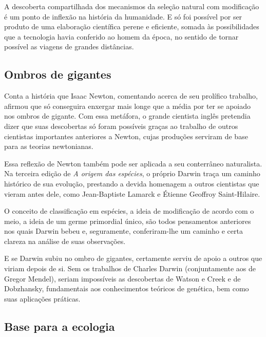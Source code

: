 \documentclass[11pt]{extarticle}
\begin{document}


A descoberta compartilhada dos mecanismos da seleção natural com modificação
é um ponto de inflexão na história da humanidade. E só foi possível por ser
produto de uma elaboração científica perene e eficiente, somada às
possibilidades que a tecnologia havia conferido ao homem da época, no sentido
de tornar possível as viagens de grandes distâncias.




\subsection{Ombros de gigantes}

Conta a história que Isaac Newton, comentando acerca de seu prolífico trabalho,
afirmou que só conseguira enxergar mais longe que a média por ter se apoiado
nos ombros de gigante. Com essa metáfora, o grande cientista inglês pretendia
dizer que suas descobertas só foram possíveis graças ao trabalho de outros
cientistas importantes anteriores a Newton, cujas produções serviram de base
para as teorias newtonianas.

Essa reflexão de Newton também pode ser aplicada a seu conterrâneo naturalista.
Na terceira edição de \emph{A origem das espécies}, o próprio Darwin traça um
caminho histórico de sua evolução, prestando a devida homenagem a outros
cientistas que vieram antes dele, como Jean-Baptiste Lamarck e Étienne Geoffroy
Saint-Hilaire.

O conceito de classificação em espécies, a ideia de modificação de acordo com
o meio, a ideia de um germe primordial único, são todos pensamentos anteriores
nos quais Darwin bebeu e, seguramente, conferiram-lhe um caminho e certa
clareza na análise de suas observações.

E se Darwin subiu no ombro de gigantes, certamente serviu de apoio a outros que
viriam depois de si. Sem os trabalhos de Charles Darwin (conjuntamente aos de
Gregor Mendel), seriam impossíveis as descobertas de Watson e Creek e de
Dobzhansky, fundamentais aos conhecimentos teóricos de genética, bem como suas
aplicações práticas.

\subsection{Base para a ecologia}
\end{document}
